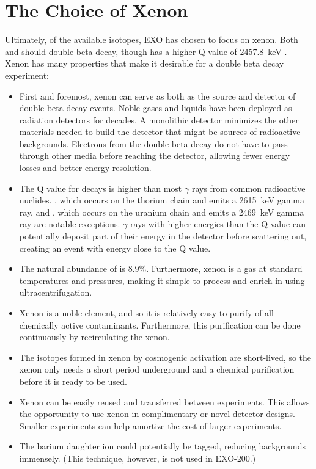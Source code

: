 \documentclass[herrin-thesis.tex]{subfiles}
\begin{document}
\section{The Choice of Xenon}
Ultimately, of the available isotopes, EXO has chosen to focus on xenon. Both  and  should double beta decay, though  has a higher Q value of \SI{2457.8}{\keV} \cite{Redshaw:2007cr}. Xenon has many properties that make it desirable for a double beta decay experiment:
\begin{itemize}
\item First and foremost, xenon can serve as both as the source and detector of double beta decay events. Noble gases and liquids have been deployed as radiation detectors for decades. A monolithic detector minimizes the other materials needed to build the detector that might be sources of radioactive backgrounds. Electrons from the double beta decay do not have to pass through other media before reaching the detector, allowing fewer energy losses and better energy resolution.
\item The Q value for  decays is higher than most \(\gamma\) rays from common radioactive nuclides. , which occurs on the thorium chain and emits a \SI{2615}{\keV} gamma ray, and , which occurs on the uranium chain and emits a \SI{2469}{\keV} gamma ray are notable exceptions. \(\gamma\) rays with higher energies than the Q value can potentially deposit part of their energy in the detector before scattering out, creating an event with energy close to the Q value.
\item The natural abundance of  is 8.9\%. Furthermore, xenon is a gas at standard temperatures and pressures, making it simple to process and enrich in  using ultracentrifugation.
\item Xenon is a noble element, and so it is relatively easy to purify of all chemically active contaminants. Furthermore, this purification can be done continuously by recirculating the xenon.
\item The isotopes formed in xenon by cosmogenic activation are short-lived, so the xenon only needs a short period underground and a chemical purification before it is ready to be used.
\item Xenon can be easily reused and transferred between experiments. This allows the opportunity to use xenon in complimentary or novel detector designs. Smaller experiments can help amortize the cost of larger experiments.
\item The barium daughter ion could potentially be tagged, reducing backgrounds immensely. (This technique, however, is not used in EXO-200.)
\end{itemize}
\end{document}
